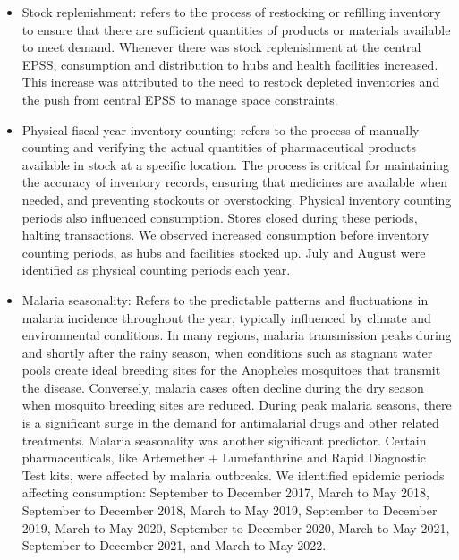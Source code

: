 \documentclass[
  authoryear,
  preprint,
  3p]{elsarticle}
\providecommand{\tightlist}{%
  \setlength{\itemsep}{0pt}\setlength{\parskip}{0pt}}\usepackage{longtable,booktabs,array}
\begin{document}
\begin{itemize}
\tightlist
\item
  Stock replenishment: refers to the process of restocking or refilling
  inventory to ensure that there are sufficient quantities of products
  or materials available to meet demand. Whenever there was stock
  replenishment at the central EPSS, consumption and distribution to
  hubs and health facilities increased. This increase was attributed to
  the need to restock depleted inventories and the push from central
  EPSS to manage space constraints.
\end{itemize}

\begin{itemize}
\tightlist
\item
  Physical fiscal year inventory counting: refers to the process of
  manually counting and verifying the actual quantities of
  pharmaceutical products available in stock at a specific location. The
  process is critical for maintaining the accuracy of inventory records,
  ensuring that medicines are available when needed, and preventing
  stockouts or overstocking. Physical inventory counting periods also
  influenced consumption. Stores closed during these periods, halting
  transactions. We observed increased consumption before inventory
  counting periods, as hubs and facilities stocked up. July and August
  were identified as physical counting periods each year.
\end{itemize}

\begin{itemize}
\tightlist
\item
  Malaria seasonality: Refers to the predictable patterns and
  fluctuations in malaria incidence throughout the year, typically
  influenced by climate and environmental conditions. In many regions,
  malaria transmission peaks during and shortly after the rainy season,
  when conditions such as stagnant water pools create ideal breeding
  sites for the Anopheles mosquitoes that transmit the disease.
  Conversely, malaria cases often decline during the dry season when
  mosquito breeding sites are reduced. During peak malaria seasons,
  there is a significant surge in the demand for antimalarial drugs and
  other related treatments. Malaria seasonality was another significant
  predictor. Certain pharmaceuticals, like Artemether + Lumefanthrine
  and Rapid Diagnostic Test kits, were affected by malaria outbreaks. We
  identified epidemic periods affecting consumption: September to
  December 2017, March to May 2018, September to December 2018, March to
  May 2019, September to December 2019, March to May 2020, September to
  December 2020, March to May 2021, September to December 2021, and
  March to May 2022.
\end{itemize}
\end{document}
